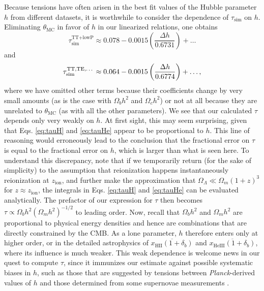 \documentclass[twocolumn,aps,prd,nofootinbib,showpacs,superscriptaddress]{revtex4-1}
\begin{document}
Because tensions have often arisen in the best fit values of the Hubble parameter $h$ from different datasets, it is worthwhile to consider the dependence of $\tau_\textrm{sim}$ on $h$. Eliminating $\theta_\textrm{MC}$ in favor of $h$ in our linearized relations, one obtains
\begin{equation}
\tau_\textrm{sim}^\textrm{TT+lowP} \approx 0.078  -0.0015 \left(\frac{\Delta h}{0.6731}\right) + \dots 
\end{equation}
and
\begin{equation}
\tau_\textrm{sim}^\textrm{TT,TE,\dots} \approx 0.064  -0.0015 \left(\frac{\Delta h}{0.6774}\right) + \dots ,
\end{equation}
where we have omitted other terms because their coefficients change by very small amounts (as is the case with $\Omega_b h^2$ and $\Omega_c h^2$) or not at all because they are unrelated to $\theta_\textrm{MC}$ (as with all the other parameters). We see that our calculated $\tau$ depends only very weakly on $h$. At first sight, this may seem surprising, given that Eqs. \eqref{eq:tauH} and \eqref{eq:tauHe} appear to be proportional to $h$. This line of reasoning would erroneously lead to the conclusion that the fractional error on $\tau$ is equal to the fractional error on $h$, which is larger than what is seen here. To understand this discrepancy, note that if we temporarily return (for the sake of simplicity) to the assumption that reionization happens instantaneously reionization at $z_\textrm{ion}$, and further make the approximation that $\Omega_\Lambda \ll \Omega_m (1+z)^3$ for $z \approx z_\textrm{ion}$, the integrals in Eqs. \eqref{eq:tauH} and \eqref{eq:tauHe} can be evaluated analytically. The prefactor of our expression for $\tau$ then becomes $\tau \propto \Omega_b h^2(\Omega_m h^2)^{-1/2}$ to leading order. Now, recall that $\Omega_b h^2$ and $\Omega_m h^2$ are proportional to physical energy densities and hence are combinations that are directly constrained by the CMB. As a lone parameter, $h$ therefore enters only at higher order, or in the detailed astrophysics of $\overline{x_\textrm{HII} (1+\delta_b)}$ and $\overline{x_\textrm{HeIII} (1+\delta_b)}$, where its influence is much weaker. This weak dependence is welcome news in our quest to compute $\tau$, since it immunizes our estimate against possible systematic biases in $h$, such as those that are suggested by tensions between \emph{Planck}-derived values of $h$ and those determined from some supernovae measurements \cite{riess_et_al2011,bennett_et_al2014,Planck2015parameters}.
\end{document}
